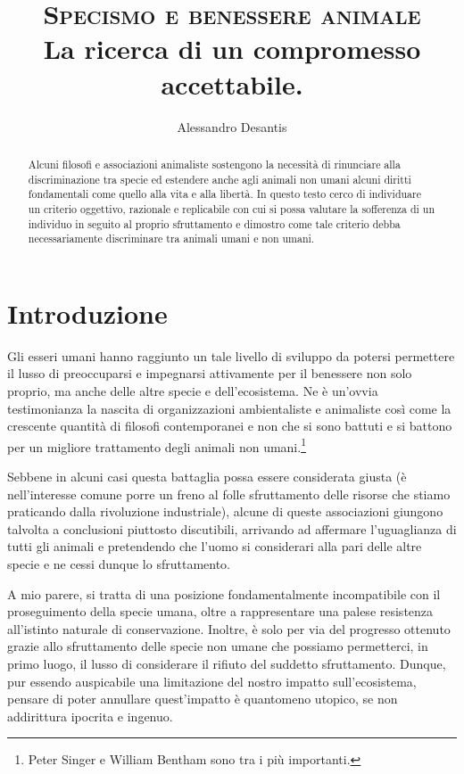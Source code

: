 \documentclass[a4paper,11pt,oneside,article]{memoir}
\title{\textsc{Specismo e benessere animale} \\ \vspace{1mm} \small{La ricerca di un compromesso accettabile.}}
\author{Alessandro Desantis}
\date{}
\begin{document}
\maketitle

\begin{abstract}

\noindent Alcuni filosofi e associazioni animaliste sostengono la necessità di
rinunciare alla discriminazione tra specie ed estendere anche agli animali non
umani alcuni diritti fondamentali come quello alla vita e alla libertà. In
questo testo cerco di individuare un criterio oggettivo, razionale e replicabile
con cui si possa valutare la sofferenza di un individuo in seguito al proprio
sfruttamento e dimostro come tale criterio debba necessariamente discriminare
tra animali umani e non umani.

\end{abstract}

\chapter{Introduzione}

Gli esseri umani hanno raggiunto un tale livello di sviluppo da potersi
permettere il lusso di preoccuparsi e impegnarsi attivamente per il benessere
non solo proprio, ma anche delle altre specie e dell'ecosistema. Ne è un'ovvia
testimonianza la nascita di organizzazioni ambientaliste e animaliste così come
la crescente quantità di filosofi contemporanei e non che si sono battuti e si
battono per un migliore trattamento degli animali non umani.\footnote{Peter
Singer e William Bentham sono tra i più importanti.}

Sebbene in alcuni casi questa battaglia possa essere considerata giusta (è
nell'interesse comune porre un freno al folle sfruttamento delle risorse che
stiamo praticando dalla rivoluzione industriale), alcune di queste associazioni
giungono talvolta a conclusioni piuttosto discutibili, arrivando ad affermare
l'uguaglianza di tutti gli animali e pretendendo che l'uomo si considerari alla
pari delle altre specie e ne cessi dunque lo sfruttamento.

A mio parere, si tratta di una posizione fondamentalmente incompatibile con il
proseguimento della specie umana, oltre a rappresentare una palese resistenza
all'istinto naturale di conservazione. Inoltre, è solo per via del progresso
ottenuto grazie allo sfruttamento delle specie non umane che possiamo
permetterci, in primo luogo, il lusso di considerare il rifiuto del suddetto
sfruttamento. Dunque, pur essendo auspicabile una limitazione del nostro impatto
sull'ecosistema, pensare di poter annullare quest'impatto è quantomeno utopico,
se non addirittura ipocrita e ingenuo.
\end{document}
